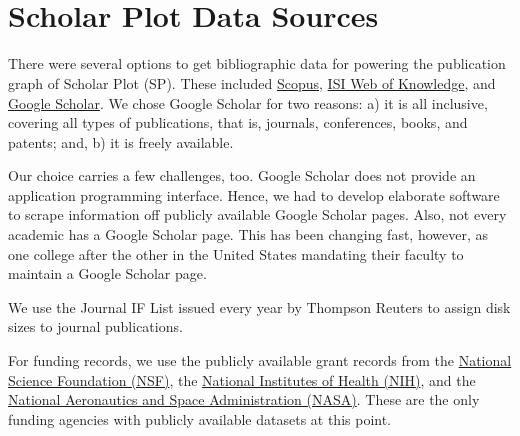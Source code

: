 \begin{enumerate}
\begin{figure}
{     }\\
     \caption{}~\label{fig:Splots} 
\end{figure} 
\end{enumerate}

\section{Scholar Plot Data Sources}
There were several options to get bibliographic data for powering the publication graph of Scholar Plot (SP). These included \href{http://www.scopus.com/}{Scopus}, \href{http://www.isiknowledge.com/}{ISI Web of Knowledge}, and \href{http://scholar.google.com}{Google Scholar}. We chose Google Scholar for two reasons: a) it is all inclusive, covering all types of publications, that is, journals, conferences, books, and patents; and, b) it is freely available.

Our choice carries a few challenges, too. Google Scholar does not provide an application programming interface. Hence, we had to develop elaborate software to scrape information off publicly available Google Scholar pages. Also, not every academic has a Google Scholar page. This has been changing fast, however, as one college after the other in the United States mandating their faculty to maintain a Google Scholar page. 

We use the Journal IF List issued every year by Thompson Reuters to assign disk sizes to journal publications.

For funding records, we use the publicly available grant records from the \href{http://www.nsf.gov/awardsearch/download.jsp}{National Science Foundation (NSF)}, the \href{http://exporter.nih.gov/ExPORTER_Catalog.aspx}{National Institutes of Health (NIH)}, and the \href{https://www.research.gov/research-portal/appmanager/base/desktop?_nfpb=true&_eventName=viewQuickSearchFormEvent_so_rsr}{National Aeronautics and Space Administration (NASA)}. These are the only funding agencies with publicly available datasets at this point.
